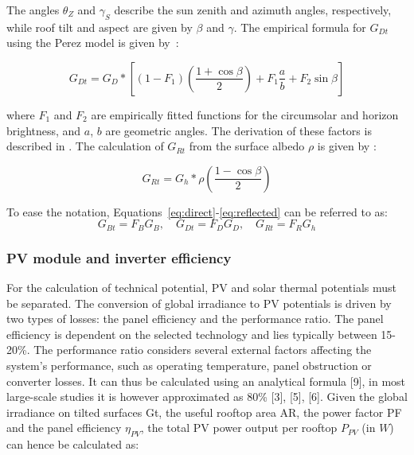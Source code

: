 The angles $\theta_Z$ and $\gamma_S$ describe the sun zenith and azimuth angles, respectively, while roof tilt and aspect are given by $\beta$ and $\gamma$.
%
The empirical formula for $G_{Dt}$ using the Perez model is given by~\cite{perez_modeling_1990}:

\begin{equation}
\label{eq:diffuse}
G_{Dt} = G_D * \left[ (1 - F_1) \left( \frac{1 + \cos \beta}{2} \right) 
       + F_1 \frac{ a }{ b }
       + F_2 \sin \beta \right]
\end{equation}

where $F_1$ and $F_2$ are empirically fitted functions for the circumsolar and horizon brightness, and $a$, $b$ are geometric angles. The derivation of these factors is described in \cite{loutzenhiser_empirical_2007}.
%
The calculation of $G_{Rt}$ from the surface albedo $\rho$ is given by \cite{duffie_solar_2013}:

\begin{equation}
\label{eq:reflected}
G_{Rt} = G_h * \rho \left( \frac{1-\cos \beta}{2} \right)
\end{equation}

To ease the notation, Equations~\ref{eq:direct}-\ref{eq:reflected} can be referred to as:
\begin{equation}
\label{eq:tilted_irrad_simplified}
G_{Bt} = F_B G_B, \quad G_{Dt} = F_D G_D, \quad G_{Rt} = F_R G_h
\end{equation}



\subsubsection{PV module and inverter efficiency}
\label{app:efficiency}

For the calculation of technical potential, PV and solar thermal potentials must be separated. The conversion of global irradiance to PV potentials is driven by two types of losses: the panel efficiency and the performance ratio. The panel efficiency is dependent on the selected technology and lies typically between 15-20\%. The performance ratio considers several external factors affecting the system’s performance, such as operating temperature, panel obstruction or converter losses. It can thus be calculated using an analytical formula [9], in most large-scale studies it is however approximated as 80\% [3], [5], [6]. Given the global irradiance on tilted surfaces Gt, the useful rooftop area AR, the power factor PF and the panel efficiency $\eta_{PV}$, the total PV power output per rooftop $P_{PV}$ (in $W$) can hence be calculated as:

